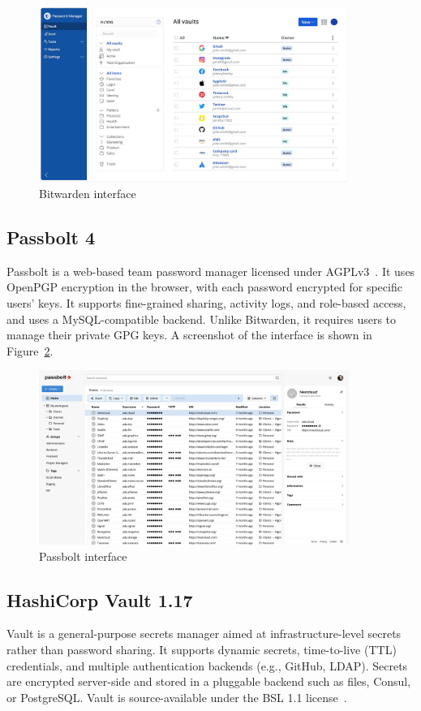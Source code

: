 \begin{figure}[H]
  \centering
  \includegraphics[width=0.9\textwidth]{imaxes/bitwarden-ui.png}
  \caption{Bitwarden interface}
  \label{fig:bitwarden-ui}
\end{figure}

\subsection{Passbolt 4}
Passbolt is a web-based team password manager licensed under AGPLv3~\cite{passbolt-security}. It uses OpenPGP encryption in the browser, with each password encrypted for specific users' keys. It supports fine-grained sharing, activity logs, and role-based access, and uses a MySQL-compatible backend. Unlike Bitwarden, it requires users to manage their private GPG keys. A screenshot of the interface is shown in Figure~\ref{fig:passbolt-ui}.

\begin{figure}[H]
  \centering
  \includegraphics[width=0.9\textwidth]{imaxes/passbolt-ui.png}
  \caption{Passbolt interface}
  \label{fig:passbolt-ui}
\end{figure}

\subsection{HashiCorp Vault 1.17}
Vault is a general-purpose secrets manager aimed at infrastructure-level secrets rather than password sharing. It supports dynamic secrets, time-to-live (TTL) credentials, and multiple authentication backends (e.g., GitHub, LDAP). Secrets are encrypted server-side and stored in a pluggable backend such as files, Consul, or PostgreSQL. Vault is source-available under the BSL 1.1 license~\cite{vault-bsl}.

